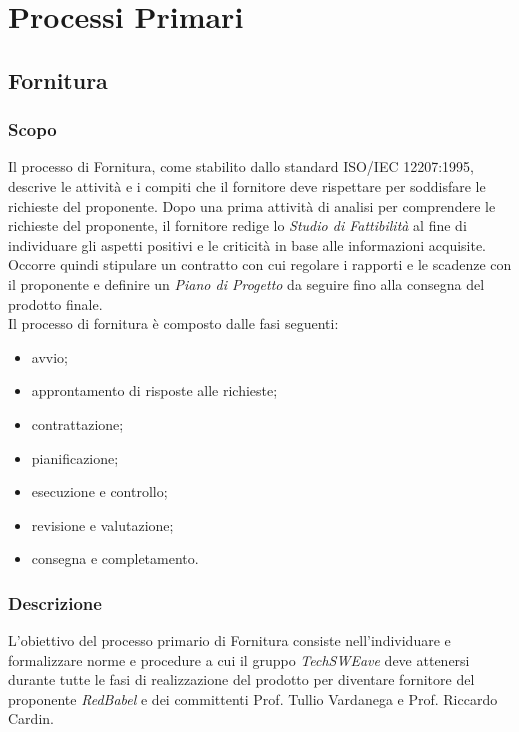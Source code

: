 \section{Processi Primari}
\subsection{Fornitura}
\subsubsection{Scopo}
Il processo di Fornitura, come stabilito dallo standard ISO/IEC 12207:1995, descrive le attività e i compiti che il fornitore deve rispettare per soddisfare le richieste del proponente. Dopo una prima attività di analisi per comprendere le richieste del proponente, il fornitore redige lo \textit{Studio di Fattibilità} al fine di individuare gli aspetti positivi e le criticità in base alle informazioni acquisite. Occorre quindi stipulare un contratto con cui regolare i rapporti e le scadenze con il proponente e definire un \textit{Piano di Progetto} da seguire fino alla consegna del prodotto finale.
\\Il processo di fornitura è composto dalle fasi seguenti:
\begin{itemize}
    \item avvio;
    \item approntamento di risposte alle richieste;
    \item contrattazione;
    \item pianificazione;
    \item esecuzione e controllo;
    \item revisione e valutazione;
    \item consegna e completamento.
\end{itemize}
\subsubsection{Descrizione}
L’obiettivo del processo primario di Fornitura consiste nell’individuare e formalizzare norme e procedure a cui il gruppo \textit{TechSWEave} deve attenersi durante tutte le fasi di realizzazione del prodotto per diventare fornitore del proponente \textit{RedBabel} e dei committenti Prof. Tullio Vardanega e Prof. Riccardo Cardin.
